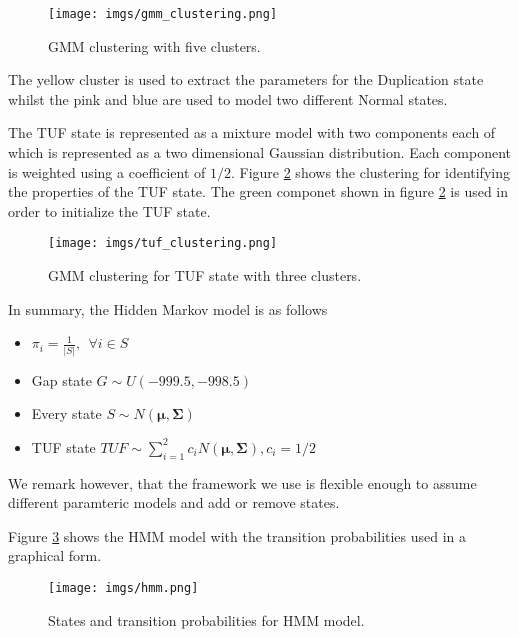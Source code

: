 \begin{figure}[!htb]
	\begin{center}
		\texttt{[image: imgs/gmm\_clustering.png]}
	\end{center}
	\caption{GMM clustering with five clusters.}
	\label{gmm_clustering}
\end{figure}  

The yellow cluster is used to extract the parameters for the Duplication state whilst the pink and blue are used to model two different Normal states.

The TUF state is represented as a mixture model with two components each of which is represented as a two dimensional Gaussian distribution. Each component is weighted using a coefficient of $1/2$.  Figure \ref{tuf_clustering} shows the clustering for identifying the properties of the TUF state. The green componet shown in figure \ref{tuf_clustering} is used in order to initialize the TUF state.


\begin{figure}[!htb]
	\begin{center}
		\texttt{[image: imgs/tuf\_clustering.png]}
	\end{center}
	\caption{GMM clustering for TUF state with three clusters.}
	\label{tuf_clustering}
\end{figure} 

In summary, the Hidden Markov model is as follows

\begin{itemize}
	\item $\pi_i = \frac{1}{|S|}, ~~ \forall i \in S$
	\item Gap state $G\sim U(-999.5, -998.5)$
	\item Every state $S \sim N(\boldsymbol{\mu}, \boldsymbol{\Sigma})$  
	\item TUF state $TUF \sim \sum_{i=1}^{2} c_i N(\boldsymbol{\mu}, \boldsymbol{\Sigma}), c_i = 1/2$
\end{itemize}
We remark however, that the framework we use is flexible enough to assume different paramteric models and add or remove states.

Figure \ref{hmm_figure}
shows the HMM model with the transition probabilities used in a graphical form.


\begin{figure}[!htb]
	\begin{center}
		\texttt{[image: imgs/hmm.png]}
	\end{center}
	\caption{States and transition probabilities for HMM model.}
	\label{hmm_figure}
\end{figure} 

